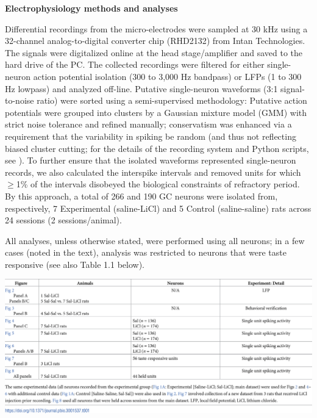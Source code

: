 \begin{refsection}
\smallskip
\noindent\textbf{Electrophysiology methods and analyses}\par
\noindent 
Differential recordings from the micro-electrodes were sampled at 30 kHz using a 32-channel analog-to-digital converter chip (RHD2132) from Intan Technologies. The signals were digitalized online at the head stage/amplifier and saved to the hard drive of the PC. The collected recordings were filtered for either single-neuron action potential isolation (300 to 3,000 Hz bandpass) or LFPs (1 to 300 Hz lowpass) and analyzed off-line. Putative single-neuron waveforms (3:1 signal-to-noise ratio) were sorted using a semi-supervised methodology: Putative action potentials were grouped into clusters by a Gaussian mixture model (GMM) with strict noise tolerance and refined manually; conservatism was enhanced via a requirement that the variability in spiking be random (and thus not reflecting biased cluster cutting; for the details of the recording system and Python scripts, see \cite{mukherjee2017a}). To further ensure that the isolated waveforms represented single-neuron records, we also calculated the interspike intervals and removed units for which \(\ge\)1\% of the intervals disobeyed the biological constraints of refractory period. By this approach, a total of 266 and 190 GC neurons were isolated from, respectively, 7 Experimental (saline-LiCl) and 5 Control (saline-saline) rats across 24 sessions (2 sessions/animal).

All analyses, unless otherwise stated, were performed using all neurons; in a few cases (noted in the text), analysis was restricted to neurons that were taste responsive (see also Table 1.1 below).

\begin{tablular}
\centering
    \includegraphics[width=\linewidth]{stone_2022_figs/journal.pbio.3001537.t001.png}
\end{tablular}


\end{refsection}
